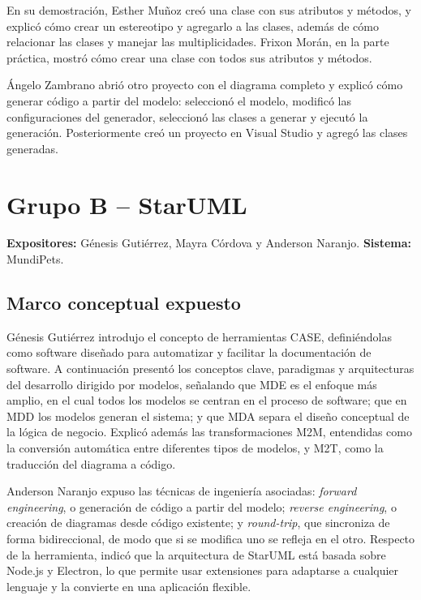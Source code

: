 \documentclass[journal,onecolumn]{IEEEtran}
\begin{document}
	En su demostración, Esther Muñoz creó una clase con sus atributos y métodos, y explicó cómo crear un estereotipo y agregarlo a las clases, además de cómo relacionar las clases y manejar las multiplicidades. Frixon Morán, en la parte práctica, mostró cómo crear una clase con todos sus atributos y métodos.
	
	Ángelo Zambrano abrió otro proyecto con el diagrama completo y explicó cómo generar código a partir del modelo: seleccionó el modelo, modificó las configuraciones del generador, seleccionó las clases a generar y ejecutó la generación. Posteriormente creó un proyecto en Visual Studio y agregó las clases generadas.
	
	\section{Grupo B -- StarUML}
	
	\textbf{Expositores:} Génesis Gutiérrez, Mayra Córdova y Anderson Naranjo. \quad \textbf{Sistema:} MundiPets.
	
	\subsection{Marco conceptual expuesto}
	
	Génesis Gutiérrez introdujo el concepto de herramientas CASE, definiéndolas como software diseñado para automatizar y facilitar la documentación de software. A continuación presentó los conceptos clave, paradigmas y arquitecturas del desarrollo dirigido por modelos, señalando que MDE es el enfoque más amplio, en el cual todos los modelos se centran en el proceso de software; que en MDD los modelos generan el sistema; y que MDA separa el diseño conceptual de la lógica de negocio. Explicó además las transformaciones M2M, entendidas como la conversión automática entre diferentes tipos de modelos, y M2T, como la traducción del diagrama a código.
	
	Anderson Naranjo expuso las técnicas de ingeniería asociadas: \textit{forward engineering}, o generación de código a partir del modelo; \textit{reverse engineering}, o creación de diagramas desde código existente; y \textit{round-trip}, que sincroniza de forma bidireccional, de modo que si se modifica uno se refleja en el otro. Respecto de la herramienta, indicó que la arquitectura de StarUML está basada sobre Node.js y Electron, lo que permite usar extensiones para adaptarse a cualquier lenguaje y la convierte en una aplicación flexible.
	
\end{document}
